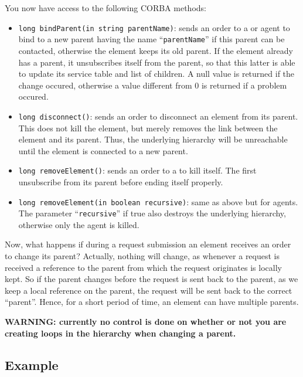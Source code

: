 You now have access to the
following CORBA methods:
\begin{itemize}
\item \verb|long bindParent(in string parentName)|: sends an order to
  a \sed or agent to bind to a new parent having the name
  ``\verb|parentName|'' if this parent can be contacted, otherwise the
  element keeps its old parent. If the element already has a parent,
  it unsubscribes itself from the parent, so that this latter is able
  to update its service table and list of children. A null value is
  returned if the change occured, otherwise a value different from 0
  is returned if a problem occured.

\item \verb|long disconnect()|: sends an order to disconnect an
  element from its parent. This does not kill the element, but merely
  removes the link between the element and its parent. Thus, the
  underlying hierarchy will be unreachable until the element is
  connected to a new parent.

\item \verb|long removeElement()|: sends an order to a \sed to kill
  itself. The \sed first unsubscribe from its parent before ending
  itself properly.

\item \verb|long removeElement(in boolean recursive)|: same as above
  but for agents. The parameter ``\verb|recursive|'' if true also
  destroys the underlying hierarchy, otherwise only the agent is
  killed.
\end{itemize}

Now, what happens if during a request submission an element receives
an order to change its parent? Actually, nothing will change, as
whenever a request is received a reference to the parent from which
the request originates is locally kept. So if the parent changes
before the request is sent back to the parent, as we keep a local
reference on the parent, the request will be sent back to the correct
``parent''. Hence, for a short period of time, an element can have
multiple parents.

\textbf{WARNING: currently no control is done on whether or not you
  are creating loops in the hierarchy when changing a parent.}

\subsection{Example}

